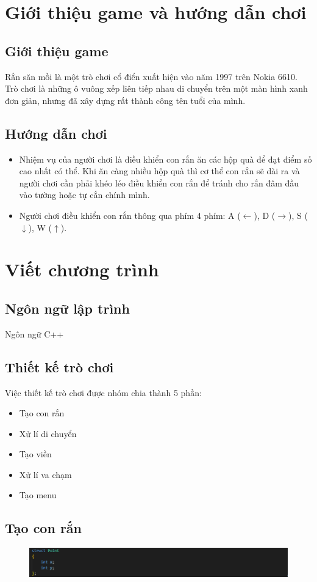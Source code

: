 \documentclass[../main-report.tex]{subfiles}
\begin{document}
\section{Giới thiệu game và hướng dẫn chơi}
\subsection{Giới thiệu game}
Rắn săn mồi là một trò chơi cổ điển xuất hiện vào năm 1997 trên Nokia 6610. Trò chơi là những ô vuông xếp liên tiếp nhau di chuyển trên một màn hình xanh đơn giản, nhưng đã xây dựng rất thành công tên tuổi của mình.

\subsection{Hướng dẫn chơi}

\begin{itemize}
\item Nhiệm vụ của người chơi là điều khiển con rắn ăn các hộp quà để đạt điểm số cao nhất có thể. Khi ăn càng nhiều hộp quà thì cơ thể con rắn sẽ dài ra và người chơi cần phải khéo léo điều khiển con rắn để tránh cho rắn đâm đầu vào tường hoặc tự cắn chính mình.
\end{itemize}

\begin{itemize}
\item Người chơi điều khiển con rắn thông qua phím 4 phím: A ($\leftarrow$), D ($\rightarrow$), S ($\downarrow$), W ($\uparrow$).
\end{itemize}

\section{Viết chương trình}
\subsection{Ngôn ngữ lập trình}
Ngôn ngữ C++
\subsection{Thiết kế trò chơi}
Việc thiết kế trò chơi được nhóm chia thành 5 phần:
\begin{itemize}
    \item Tạo con rắn
    \item Xử lí di chuyển
    \item Tạo viền
    \item Xử lí va chạm
    \item Tạo menu
\end{itemize}
\subsection{Tạo con rắn}
\begin{figure}[ht]
    \centering
    \includegraphics[scale=0.6]{hinh/snake1.png}
\end{figure}
\end{document}
